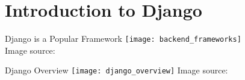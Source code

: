 \section{Introduction to Django}


\begin{frame}[c]{Django is a Popular Framework}
    \texttt{[image: backend\_frameworks]} \\
    Image source: \cite{frameworks}
\end{frame}


\begin{frame}{Django Overview}
    \texttt{[image: django\_overview]}
    Image source: \cite{overview}
\end{frame}


